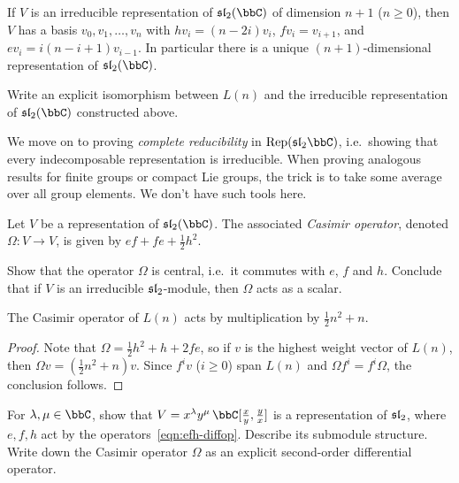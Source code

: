 \begin{corollary}
    If $V$ is an irreducible representation of $\sl_2(\bbC)$ of dimension $n+1$
    ($n\geq 0$), then $V$ has a basis $v_0,v_1,\ldots, v_n$ with $hv_i =
    (n-2i)v_i$, $fv_i=v_{i+1}$, and $ev_i=i(n-i+1)v_{i-1}$. In particular there
    is a unique $(n+1)$-dimensional representation of $\sl_2(\bbC)$.
\end{corollary}

\begin{exercise}
    Write an explicit isomorphism between $L(n)$ and the irreducible
    representation of $\sl_2(\bbC)$ constructed above.
\end{exercise}

We move on to proving \emph{complete reducibility} in $\text{Rep}(\sl_2\bbC)$,
i.e.\ showing that every indecomposable representation is irreducible. When
proving analogous results for finite groups or compact Lie groups, the trick is
to take some average over all group elements. We don't have such tools here.

\begin{definition}
    Let $V$ be a representation of $\sl_2(\bbC)$. The associated \emph{Casimir
    operator}, denoted $\Omega\colon V\to V$, is given by
    $ef+fe+\frac{1}{2}h^2$.
\end{definition}

\begin{exercise}
    Show that the operator $\Omega$ is central, i.e.\ it commutes with $e$, $f$
    and $h$. Conclude that if $V$ is an irreducible $\sl_2$-module, then $\Omega$
    acts as a scalar.
\end{exercise}

\begin{lemma}
    The Casimir operator of $L(n)$ acts by multiplication by $\frac{1}{2}n^2+n$.
    \begin{proof}
        Note that $\Omega = \frac{1}{2}h^2+h+2fe$, so if $v$ is the highest
        weight vector of $L(n)$, then $\Omega v = (\frac{1}{2}n^2+n)v$. Since
        $f^iv$ ($i\geq 0$) span $L(n)$ and $\Omega f^i = f^i \Omega$, the
        conclusion follows.
    \end{proof}
\end{lemma}

\begin{exercise}
    For $\lambda,\mu\in \bbC$, show that $V=x^\lambda y^\mu \,\bbC[\frac{x}{y},
    \frac{y}{x}]$ is a representation of $\sl_2$, where $e,f,h$ act by the
    operators~\eqref{eqn:efh-diffop}. Describe its submodule structure. Write
    down the Casimir operator $\Omega$ as an explicit second-order differential
    operator.
\end{exercise}

